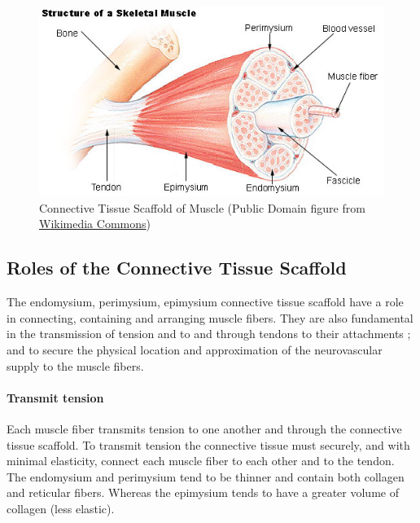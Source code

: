 \begin{figure}[!ht]
    \centering
    \includegraphics[width=1\linewidth]{./figure/muscle_scaffold.jpg}
    \caption{Connective Tissue Scaffold of Muscle \footnotesize{(Public Domain figure from \href{https://commons.wikimedia.org/wiki/File:Illu_muscle_structure.jpg}{Wikimedia Commons})}}
    \label{fig:muscle_scaffold}
\end{figure}

\subsection{Roles of the Connective Tissue Scaffold}

The endomysium, perimysium, epimysium connective tissue scaffold have a role in connecting, containing and arranging muscle fibers. They are also fundamental in the transmission of tension and to and through tendons to their attachments \cite{turrina_muscular_2013}; and to secure the physical location and approximation of the neurovascular supply to the muscle fibers.

\paragraph{Transmit tension}

Each muscle fiber transmits tension to one another and through the connective tissue scaffold. To transmit tension the connective tissue must securely, and with minimal elasticity, connect each muscle fiber to each other and to the tendon. The endomysium and perimysium tend to be thinner and contain both collagen and reticular fibers. Whereas the epimysium tends to have a greater volume of collagen (less elastic). 


